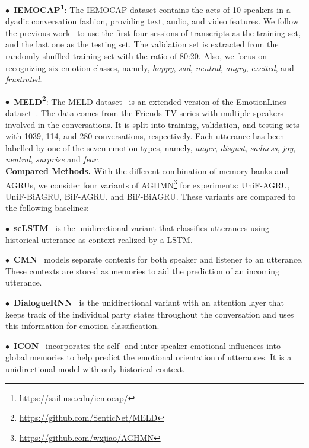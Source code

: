 \documentclass[letterpaper]{article} %
\begin{document}
$\bullet$~\textbf{IEMOCAP\footnote{\url{https://sail.usc.edu/iemocap/}}}:
The IEMOCAP dataset contains the acts of 10 speakers in a dyadic conversation fashion, providing text, audio, and video features. We follow the previous work~\cite{DBLP:conf/emnlp/HazarikaPMCZ18} to use the first four sessions of transcripts as the training set, and the last one as the testing set. The validation set is extracted from the randomly-shuffled training set with the ratio of 80:20. Also, we focus on recognizing six emotion classes, namely, \textit{happy}, \textit{sad}, \textit{neutral}, \textit{angry}, \textit{excited}, and \textit{frustrated}.

$\bullet$~\textbf{MELD\footnote{\url{https://github.com/SenticNet/MELD}}}:
The MELD dataset~\cite{DBLP:conf/acl/PoriaHMNCM19} is an extended version of the EmotionLines dataset~\cite{DBLP:conf/lrec/HsuCKHK18}. The data comes from the Friends TV series with multiple speakers involved in the conversations. It is split into training, validation, and testing sets with 1039, 114, and 280 conversations, respectively. Each utterance has been labelled by one of the seven emotion types, namely, \textit{anger}, \textit{disgust}, \textit{sadness}, \textit{joy}, \textit{neutral}, \textit{surprise} and \textit{fear}.
\\[1ex]
\noindent\textbf{Compared Methods.}
With the different combination of memory banks and AGRUs, we consider four variants of AGHMN\footnote{\url{https://github.com/wxjiao/AGHMN}} for experiments: UniF-AGRU, UniF-BiAGRU, BiF-AGRU, and BiF-BiAGRU.
These variants are compared to the following baselines:

$\bullet$~\textbf{scLSTM}~\cite{DBLP:conf/acl/PoriaCHMZM17} is the unidirectional variant that classifies utterances using historical utterance as context realized by a LSTM.

$\bullet$~\textbf{CMN}~\cite{DBLP:conf/naacl/HazarikaPZCMZ18} models separate contexts for both speaker and listener to an utterance. These contexts are stored as memories to aid the prediction of an incoming utterance.

$\bullet$~\textbf{DialogueRNN}~\cite{DBLP:conf/aaai/MajumderPHMGC19} is the unidirectional variant with an attention layer that keeps track of the individual party states throughout the conversation and uses this information for emotion classification.

$\bullet$~\textbf{ICON}~\cite{DBLP:conf/emnlp/HazarikaPMCZ18} incorporates the self- and inter-speaker emotional influences into global memories to help predict the emotional orientation of utterances. It is a unidirectional model with only historical context.
\end{document}
